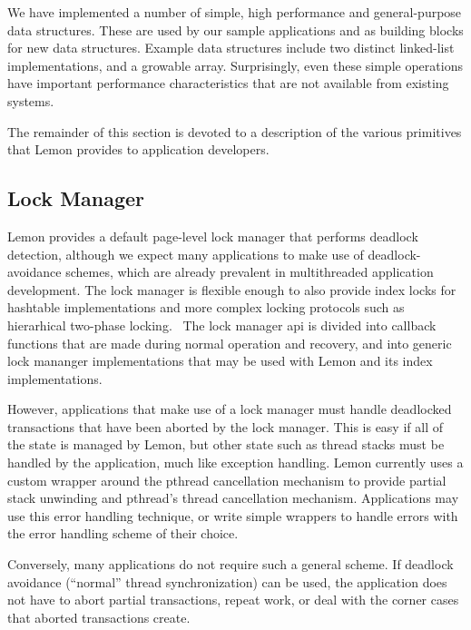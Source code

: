 \documentclass[10pt,letterpaper,twocolumn,english]{article}
\newcommand{\yad}{Lemon\xspace}
\newcommand{\eab}[1]{\textcolor{red}{\bf EAB: #1}}
\begin{document}
We have implemented a number of simple, high performance
and general-purpose data structures.  These are used by our sample
applications and as building blocks for new data structures.  Example
data structures include two distinct linked-list implementations, and
a growable array.  Surprisingly, even these simple operations have
important performance characteristics that are not available from
existing systems. 

The remainder of this section is devoted to a description of the
various primitives that \yad provides to application developers.

\subsection{Lock Manager}
\label{lock-manager}

 \yad provides a default page-level lock manager that performs deadlock
detection, although we expect many applications to make use of
deadlock-avoidance schemes, which are already prevalent in
multithreaded application development.  The lock manager is flexible
enough to also provide index locks for hashtable implementations and 
more complex locking protocols such as hierarhical two-phase 
locking.~\cite{hierarcicalLocking,hierarchicalLockingOnAriesExample}  
The lock manager api is divided into callback functions that are made 
during normal operation and recovery, and into generic lock mananger 
implementations that may be used with \yad and its index implementations.


However, applications that
make use of a lock manager must handle deadlocked transactions
that have been aborted by the lock manager.  This is easy if all of
the state is managed by \yad, but other state such as thread stacks
must be handled by the application, much like exception handling.  
\yad currently uses a custom wrapper around the pthread cancellation 
mechanism to provide partial stack unwinding and pthread's thread
cancellation mechanism.  Applications may use this error handling 
technique, or write simple wrappers to handle errors with the 
error handling scheme of their choice.

Conversely, many applications do not require such a general scheme.
If deadlock avoidance (``normal'' thread synchronization) can be used,
the application does not have to abort partial transactions, repeat
work, or deal with the corner cases that aborted transactions create.
\end{document}
